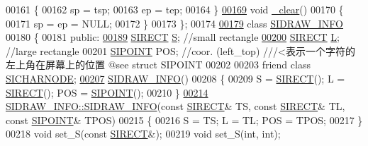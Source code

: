 \begin{DoxyCode}
00161     \{
00162         sp = tsp;
00163         ep = tep;
00164     \}
\hyperlink{struct_s_i_r_a_n_g_e_afa57adc9093ce9213bedf4bb4c74310a}{00169}     \textcolor{keywordtype}{void} \hyperlink{struct_s_i_r_a_n_g_e_afa57adc9093ce9213bedf4bb4c74310a}{\_clear}()
00170     \{
00171         sp = ep = NULL;
00172     \}
00173 \};
00174 
\hyperlink{class_s_i_d_r_a_w___i_n_f_o}{00179} \textcolor{keyword}{class }\hyperlink{class_s_i_d_r_a_w___i_n_f_o}{SIDRAW\_INFO}
00180 \{
00181 \textcolor{keyword}{public}:
\hyperlink{class_s_i_d_r_a_w___i_n_f_o_a495fac5bcc54e4b58d500a7117fde9d9}{00189}     \hyperlink{struct_s_i_r_e_c_t}{SIRECT} \hyperlink{class_s_i_d_r_a_w___i_n_f_o_a495fac5bcc54e4b58d500a7117fde9d9}{S};        \textcolor{comment}{//small rectangle   }
\hyperlink{class_s_i_d_r_a_w___i_n_f_o_a41065961d296d245790773771670aae2}{00200} \textcolor{comment}{}    \hyperlink{struct_s_i_r_e_c_t}{SIRECT} \hyperlink{class_s_i_d_r_a_w___i_n_f_o_a41065961d296d245790773771670aae2}{L};        \textcolor{comment}{//large rectangle   }
00201     \hyperlink{struct_s_i_p_o_i_n_t}{SIPOINT} POS; \textcolor{comment}{//coor. (left\_top)  ///<表示一个字符的左上角在屏幕上的位置 @see struct SIPOINT}
00202 
00203     \textcolor{keyword}{friend} \textcolor{keyword}{class }\hyperlink{class_s_i_c_h_a_r_n_o_d_e}{SICHARNODE};
\hyperlink{class_s_i_d_r_a_w___i_n_f_o_a2a34a37accb2d31386f1ac4003375227}{00207}     \hyperlink{class_s_i_d_r_a_w___i_n_f_o_a2a34a37accb2d31386f1ac4003375227}{SIDRAW\_INFO}()    
00208     \{
00209         S = \hyperlink{struct_s_i_r_e_c_t}{SIRECT}(); L = \hyperlink{struct_s_i_r_e_c_t}{SIRECT}(); POS = \hyperlink{struct_s_i_p_o_i_n_t}{SIPOINT}();
00210     \}
\hyperlink{class_s_i_d_r_a_w___i_n_f_o_a48107d70e4071d1d925f722085876c3a}{00214}     \hyperlink{class_s_i_d_r_a_w___i_n_f_o_a2a34a37accb2d31386f1ac4003375227}{SIDRAW\_INFO::SIDRAW\_INFO}(\textcolor{keyword}{const} \hyperlink{struct_s_i_r_e_c_t}{SIRECT}& TS, \textcolor{keyword}{const} 
      \hyperlink{struct_s_i_r_e_c_t}{SIRECT}& TL, \textcolor{keyword}{const} \hyperlink{struct_s_i_p_o_i_n_t}{SIPOINT}& TPOS)   
00215     \{
00216         S = TS; L = TL; POS = TPOS;
00217     \}   
00218     \textcolor{keywordtype}{void} set\_S(\textcolor{keyword}{const} \hyperlink{struct_s_i_r_e_c_t}{SIRECT}&);    
00219     \textcolor{keywordtype}{void} set\_S(\textcolor{keywordtype}{int}, \textcolor{keywordtype}{int});   

\end{DoxyCode}
